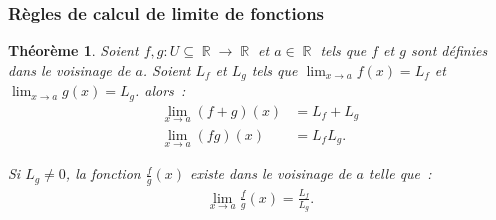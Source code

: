 \documentclass{article}
\DeclareMathOperator{\R}{\mathbb R}
\newtheorem{thm}{Théorème}[section]
\theoremstyle{definition}
\theoremstyle{remark}
\begin{document}
		\subsubsection{Règles de calcul de limite de fonctions}

			\begin{thm} Soient $f, g : U \subseteq \R \to \R$ et $a \in \R$ tels que $f$ et $g$ sont définies dans le voisinage de $a$. Soient $L_f$ et $L_g$ tels
			que $\lim_{x \to a}f(x) = L_f$ et $\lim_{x \to a}g(x) = L_g$. alors~:
			\[\begin{aligned}
				\lim_{x \to a}(f+g)(x) &= L_f + L_g \\
				\lim_{x \to a}(fg)(x) &= L_fL_g.
			\end{aligned}\]

			Si $L_g \neq 0$, la fonction $\frac fg(x)$ existe dans le voisinage de $a$ telle que~:
			\[\begin{aligned}\lim_{x \to a}\frac fg(x) = \frac {L_f}{L_g}.\end{aligned}\]
			\end{thm}
\end{document}
